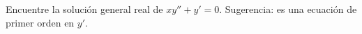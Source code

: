 Encuentre la solución general real de $xy''+y'=0$. Sugerencia: es una ecuación de primer orden en $y'$.
